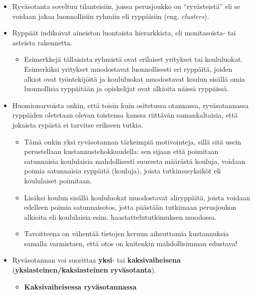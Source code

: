 \documentclass[
]{book}
\providecommand{\tightlist}{%
  \setlength{\itemsep}{0pt}\setlength{\parskip}{0pt}}
\begin{document}
\begin{itemize}
\item
  Ryväsotanta soveltuu tilanteisiin, joissa perusjoukko on ``ryvästeistä'' eli se voidaan jakaa luonnollisiin ryhmiin eli ryppäisiin (eng. \emph{clusters}).
\item
  Ryppäät indikoivat aineiston luontaista hierarkkista, eli monitasoista- tai asteista rakennetta.

  \begin{itemize}
  \tightlist
  \item
    Esimerkkejä tällaisista ryhmistä ovat erilaiset yritykset tai koululuokat. Esimerkiksi yritykset muodostavat luonnollisesti eri ryppäitä, joiden alkiot ovat työntekijöitä ja koululuokat muodostavat koulun sisällä omia luonnollisia ryppäitään ja opiskelijat ovat alkioita näissä ryppäissä.
  \end{itemize}
\item
  Huomionarvoista onkin, että toisin kuin ositetussa otannassa, ryväsotannassa ryppäiden oletetaan olevan toistensa kanssa riittävän samankaltaisia, että jokaista rypästä ei tarvitse erikseen tutkia.

  \begin{itemize}
  \tightlist
  \item
    Tämä onkin yksi ryväsotannan tärkeimpiä motivointeja, sillä sitä usein perustellaan kustannustehokkuudella: sen sijaan että poimitaan satunnaisia koululaisia mahdollisesti suuresta määrästä kouluja, voidaan poimia satunnaisia ryppäitä (kouluja), joista tutkimusyksiköt eli koululaiset poimitaan.
  \item
    Lisäksi koulun sisällä koululuokat muodostavat aliryppäitä, joista voidaan edelleen poimia satunnaisotos, jotta päästään tutkimaan perusjoukon alkioita eli koululaisia esim. haastattelututkimuksen muodossa.
  \item
    Tavoitteena on vähentää tietojen keruun aiheuttamia kustannuksia samalla varmistaen, että otos on kuitenkin mahdollisimman edustava!
  \end{itemize}
\item
  Ryväsotannan voi suorittaa \textbf{yksi}- tai \textbf{kaksivaiheisena} (\textbf{yksiasteinen/kaksiasteinen ryväsotanta}).

  \begin{itemize}
  \tightlist
  \item
    \textbf{Kaksivaiheisessa ryväsotannassa}


\end{itemize}
\end{itemize}
\end{document}

